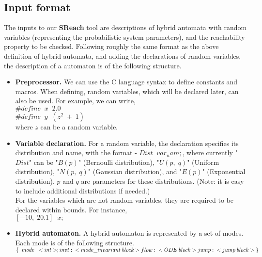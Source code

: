 \subsection{Input format}
The inputs to our {\bf SReach} tool are descriptions of hybrid automata with random variables (representing the probabilistic system parameters), and the reachability property to be checked. Following roughly the same format as the above definition of hybrid automata, and adding the declarations of random variables, the description of a automaton is of the following structure.
\begin{itemize}
\item {\bf Preprocessor.} We can use the C language syntax to define constants and macros. When defining, random variables, which will be declared later, can also be used. For example, we can write,\\

$\#define\;\; x \;\;2.0$\\
$\#define\;\; y\;\; (z^2 \;+\; 1)$\\

where $z$ can be a random variable.\\

\item {\bf Variable declaration.} For a random variable, the declaration specifies its distribution and name, with the format - $Dist \; \; var_nam;$, where currently "$Dist$" can be "$B(p)$" (Bernoulli distribution), "$U(p, \;q)$" (Uniform distribution), "$N(p, \;q)$" (Gaussian distribution), and "$E(p)$" (Exponential distribution). $p$ and $q$ are parameters for these distributions. (Note: it is easy to include additional distributions if needed.)\\
For the variables which are not random variables, they are required to be declared within bounds. For instance,\\
$[-10, \; 20.1]\; \;  x;$\\

\item {\bf Hybrid automaton.} A hybrid automaton is represented by a set of modes. Each mode is of the following structure.\\

$
\{\;\; mode \;\; <int>;\\
invt: \;\; <mode\_invariant\; block>\\
flow: \;\; <ODE\; block>\\
jump: \;\; <jump\;block>\\
\}
$\\


\end{itemize}
